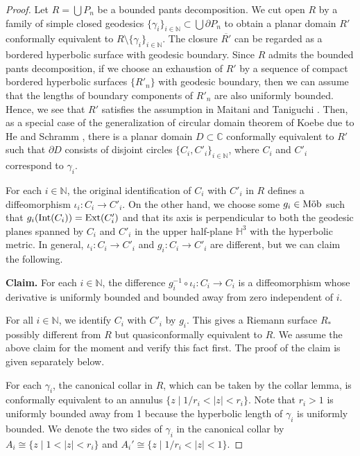 \documentclass[12pt]{amsart}
\theoremstyle{plain}
\DeclareMathOperator{\Mob}{\mbox{\rm{M\"ob}}}
\DeclareMathOperator{\Int}{\rm Int}
\DeclareMathOperator{\Ext}{\rm Ext}
\begin{document}
\begin{proof} 
Let $R=\bigcup P_n$ be a bounded pants decomposition.
We cut open $R$ by a family of simple closed geodesics $\{\gamma_i\}_{i \in \mathbb N} \subset \bigcup \partial P_n$
to obtain a planar domain $R'$ conformally equivalent to $R \setminus\{\gamma_i\}_{i \in \mathbb N}$.
The closure $\overline{R'}$ can be regarded as a bordered hyperbolic surface with geodesic boundary.
Since $R$ admits the bounded pants decomposition, if we choose an exhaustion of $R'$ by a sequence of
compact bordered hyperbolic surfaces $\{R'_n\}$ with geodesic boundary, then we can assume that
the lengths of boundary components of $R'_n$ are also uniformly bounded. Hence,
we see that $R'$ satisfies the assumption in Maitani and Taniguchi \cite[Th.1]{MaiTani}.
Then, as a special case of
the generalization of circular domain theorem of Koebe due to He and Schramm \cite{HS1,HS2}, 
there is a planar domain $D \subset \mathbb C$
conformally equivalent to $R'$ such that $\partial D$ consists of disjoint circles $\{C_i, C'_i\}_{i \in \mathbb N}$,
where $C_i$ and $C'_i$ correspond to $\gamma_i$.

For each $i \in \mathbb N$, the original identification of $C_i$ with $C'_i$ in $R$
defines a diffeomorphism $\iota_i:C_i \to C'_i$. On the other hand, 
we choose some
$g_i \in \Mob$ such that $g_i(\Int (C_i))=\Ext (C'_i)$ and that its axis  
is perpendicular to both the geodesic planes spanned by $C_i$ and $C'_i$
in the upper half-plane
${\mathbb H}^3$ with the hyperbolic metric. In general, $\iota_i:C_i \to C'_i$ and $g_i:C_i \to C'_i$ are different,
but we can claim the following.

\smallskip
\noindent
{\bf Claim.} For each $i \in \mathbb N$, 
the difference $g_i^{-1} \circ \iota_i:C_i \to C_i$ is a diffeomorphism whose derivative is
uniformly bounded and bounded away from zero independent of $i$.
\smallskip

For all $i \in \mathbb N$, we identify $C_i$ with $C'_i$ by $g_i$. This gives a Riemann surface $R_*$
possibly different from $R$ but quasiconformally equivalent to $R$.
We assume the above claim for the moment and verify this fact first. The proof of the claim is
given separately below. 

For each $\gamma_i$, the canonical collar in $R$, which can be taken by the collar lemma,
is conformally equivalent to an annulus $\{z \mid 1/r_i<|z|<r_i\}$. Note that $r_i>1$ is uniformly bounded away from 1
because the hyperbolic length of $\gamma_i$ is uniformly bounded. 
We denote the two sides of $\gamma_i$ in the canonical collar
by  $A_i \cong \{z \mid 1<|z|<r_i\}$ and $A_i' \cong \{z \mid 1/r_i<|z|<1\}$. 


\end{proof}
\end{document}
